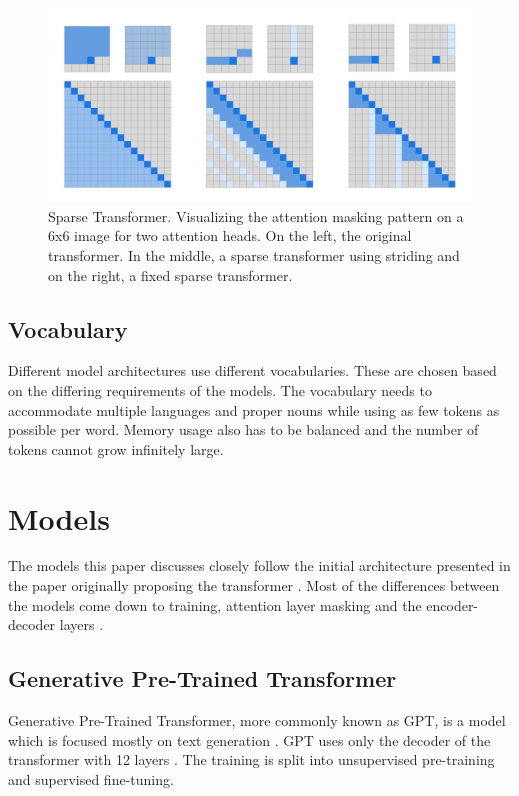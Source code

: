 \documentclass[twoside]{article}
\begin{document}
\begin{figure}[h]
  \centering
  \includegraphics*[scale=0.1]{img/sparse_transformer.png}
  \caption{
    Sparse Transformer. Visualizing the attention masking pattern on a 6x6 image
    for two attention heads. On the left, the original transformer. In the middle,
    a sparse transformer using striding and on the right, a fixed sparse transformer.
    \cite{child_generating_2019}
  }
\label{sparse_transformer}
\end{figure}

\subsection{Vocabulary}
Different model architectures use different vocabularies. These are chosen based
on the differing requirements of the models. The vocabulary needs to accommodate 
multiple languages and proper nouns while using as few tokens as possible per word.
Memory usage also has to be balanced and the number of tokens cannot grow infinitely
large. 

\section{Models}

The models this paper discusses closely follow the initial architecture
presented in the paper originally proposing the transformer 
\cite{vaswani_attention_2017}. Most of the differences between 
the models come down to training, attention layer masking and the encoder-decoder layers
\cite{raffel_exploring_2020}.


\subsection{Generative Pre-Trained Transformer}
Generative Pre-Trained Transformer, more commonly known as GPT, is a model
which is focused mostly on text generation \cite{brown_language_2020}. 
GPT uses only the decoder of the transformer with 12 layers 
\cite{radford_improving_nodate}. The training is split into unsupervised
pre-training and supervised fine-tuning. 
\end{document}
